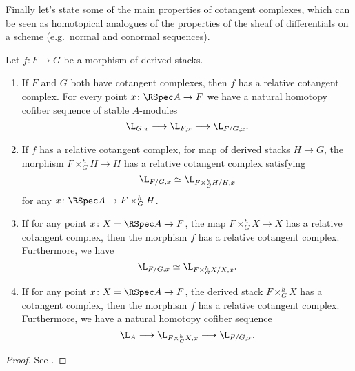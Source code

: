         Finally let's state some of the main properties of cotangent complexes, which can be seen as homotopical analogues of the properties of the sheaf of differentials on a scheme (e.g.\ normal and conormal sequences).
        \begin{lemma}
            \label{lemma:properties_cotangent_complex}
            Let $f\colon F \to G$ be a morphism of derived stacks.
            \begin{enumerate}
                \item If $F$ and $G$ both have cotangent complexes, then $f$ has a relative cotangent complex. For every point $x\colon \RSpec A \to F$ we have a natural homotopy cofiber sequence of stable $A$-modules \[\L_{G,x} \longrightarrow \L_{F, x} \longrightarrow \L_{F/G, x}. \]
                \item If $f$ has a relative cotangent complex, for map of derived stacks $H \to G$, the morphism $F \times^h_G H \to H$ has a relative cotangent complex satisfying \[\L_{F/G, x} \simeq \L_{F \times^h_G H/H, x} \] for any $x\colon \RSpec A \to F \times^h_G H$.
                \item If for any point $x\colon X = \RSpec A \to F$, the map $F \times^h_G X \to X$ has a relative cotangent complex, then the morphism $f$ has a relative cotangent complex. Furthermore, we have \[ \L_{F/G, x} \simeq \L_{F \times^h_G X/X, x}. \]
                \item If for any point $x\colon X = \RSpec A \to F$, the derived stack $F \times^h_G X$ has a cotangent complex, then the morphism $f$ has a relative cotangent complex. Furthermore, we have a natural homotopy cofiber sequence \[ \L_A \longrightarrow \L_{F \times^h_G X, x} \longrightarrow \L_{F/G, x}. \]
            \end{enumerate}
        \end{lemma}
        \begin{proof}
            See \cite[Lemma~1.4.1.16]{ToVe:hag2}.
        \end{proof}
